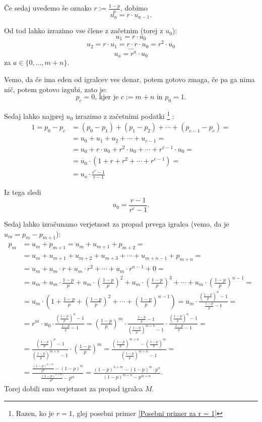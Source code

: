 \documentclass[12pt, a4paper]{article}
\begin{document}
Če sedaj uvedemo še oznako $r:=\frac{1-p}{p}$, dobimo
$$u_a = r \cdot u_{a-1}.$$

Od tod lahko izrazimo vse člene z začetnim (torej z $u_0$):
$$u_1 = r \cdot u_0$$
$$u_2 = r \cdot u_1 = r \cdot r \cdot u_0 = r^2 \cdot u_0$$ 
$$\cdots $$
$$u_a = r^a \cdot u_0$$ za $ a \in \{ 0, \dotso , m + n\}.$

Vemo, da če ima eden od igralcev ves denar, potem gotovo zmaga, če pa ga nima nič, potem gotovo izgubi, zato je:
$$p_c = 0 \textrm{, kjer je } c := m + n \textrm{ in } p_0 = 1.$$

Sedaj lahko najprej $u_0$ izrazimo z začetnimi podatki \footnote{Razen, ko je $r = 1$, glej posebni primer \ref{Posebni primer za r = 1}} :
\begin{equation*}
\begin{split}
1 = p_0 - p_c &= (p_0 - p_1) + (p_1 - p_2) + \cdots + (p_{c-1} - p_c) = \\
        &= u_0 + u_1 + u_2 + \cdots + u_{c-1} = \\
        &= u_0 + r \cdot u_0 + r^2 \cdot u_0 + \cdots + r^{c-1} \cdot u_0 = \\
        &= u_0 \cdot (1 + r + r^2 + \cdots + r^{c-1}) = \\
        &= u_o \cdot \frac{r^c - 1}{r-1}  
\end{split}
\end{equation*}  

Iz tega sledi $$u_0 = \frac{r-1}{r^c -1}.$$

\newpage
Sedaj lahko izračunamo verjetnost za propad prvega igralca (vemo, da je $u_m = p_m - p_{m+1}$):
\begin{equation*}
\begin{split}
p_m &= u_m + p_{m+1} = u_m + u_{m+1} + p_{m+2} = \\
    &= u_m + u_{m+1} + u_{m+2} + u_{m+3} + \cdots + u_{m+n-1} + p_{m+n} = \\
    &= u_m + u_m \cdot r + u_m \cdot r^2 + \cdots + u_m \cdot r^{n-1} + 0 = \\
    &= u_m + u_m \cdot \frac{1-p}{p} + u_m \cdot (\frac{1-p}{p})^2 + u_m \cdot (\frac{1-p}{p})^3 + \cdots + u_m \cdot (\frac{1-p}{p})^{n-1} = \\
    &= u_m \cdot (1 + \frac{1-p}{p} + (\frac{1-p}{p})^2 + \cdots + (\frac{1-p}{p})^{n-1}) 
    = u_m \cdot \frac{(\frac{1-p}{p})^n - 1}{\frac{1-p}{p} - 1} = \\
    &= r^m \cdot u_0 \cdot \frac{(\frac{1-p}{p})^n - 1}{\frac{1-p}{p} - 1}  
    = (\frac{1-p}{p})^m \cdot \frac{\frac{1-p}{p} - 1}{(\frac{1-p}{p})^{m+n} -1}\cdot \frac{(\frac{1-p}{p})^n - 1}{\frac{1-p}{p} - 1} = \\
    &= \frac{(\frac{1-p}{p})^n - 1}{(\frac{1-p}{p})^{m+n} -1} \cdot (\frac{1-p}{p})^m 
    = \frac{(\frac{1-p}{p})^{m+n} - (\frac{1-p}{p})^m}{(\frac{1-p}{p})^{m+n} -1} = \\
    &= \frac{\frac{(1-p)^{n+m}}{p^n} - (1-p)^m}{\frac{(1-p)^{n+m}}{p^n} - p^m} = 
    \frac{(1-p)^{n+m} - (1-p)^m \cdot p^n}{(1-p)^{m+n} - p^{m+n}}.
\end{split} 
\end{equation*}
Torej dobili smo verjetnost za propad igralca $M$.
\end{document}
